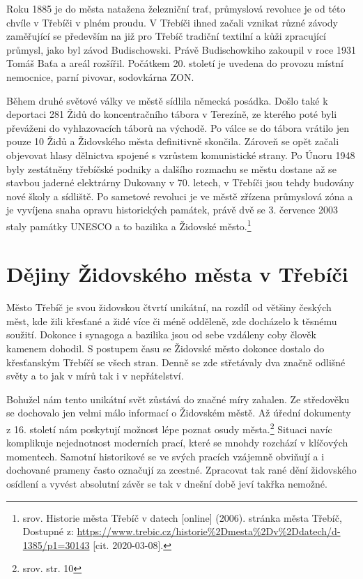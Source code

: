 \documentclass[a4paper,oneside,12pt]{report}
\begin{document}
Roku 1885 je do města natažena železniční trať, průmyslová revoluce je od této chvíle v Třebíči v plném proudu.
V Třebíči ihned začali vznikat různé závody zaměřující se především na již pro Třebíč tradiční textilní a kůži zpracující průmysl, jako byl závod Budischowski.
Právě Budischowkiho zakoupil v roce 1931 Tomáš Baťa a areál rozšířil.
Počátkem 20. století je uvedena do provozu místní nemocnice, parní pivovar, sodovkárna ZON.

Během druhé světové války ve městě sídlila německá posádka.
Došlo také k deportaci 281 Židů do koncentračního tábora v Terezíně, ze kterého poté byli převáženi do vyhlazovacích táborů na východě.
Po válce se do tábora vrátilo jen pouze 10 Židů a  Židovského města definitivně skončila.
Zároveň se opět začali objevovat hlasy dělnictva spojené s vzrůstem komunistické strany.
Po Únoru 1948 byly zestátněny třebíčské podniky a dalšího rozmachu se městu dostane až se stavbou jaderné elektrárny Dukovany v 70. letech, v Třebíči jsou tehdy budovány nové školy a sídliště.
Po sametové revoluci je ve městě zřízena průmyslová zóna a je vyvíjena snaha opravu historických památek, právě dvě se 3. července 2003 staly památky UNESCO a to bazilika a Židovské město.\footnote{srov. Historie města Třebíč v datech [online] (2006). stránka města Třebíč, Dostupné z: \url{https://www.trebic.cz/historie\%2Dmesta\%2Dv\%2Ddatech/d-1385/p1=30143} [cit. 2020-03-08]. }


\chapter{Dějiny Židovského města v Třebíči}

Město Třebíč je svou židovskou čtvrtí unikátní, na rozdíl od většiny českých měst, kde žili křesťané a židé více či méně odděleně, zde docházelo k těsnému soužití.
Dokonce i synagoga a bazilika jsou od sebe vzdáleny coby člověk kamenem dohodil.
S postupem času se Židovské město dokonce dostalo do  křesťanským Třebíčí se všech stran.
Denně se zde střetávaly dva značně odlišné světy a to jak v mírů tak i v nepřátelství.

Bohužel nám tento unikátní svět zůstává do značné míry zahalen.
Ze středověku se dochovalo jen velmi málo informací o Židovském městě.
Až úřední dokumenty z 16. století nám poskytují možnost lépe poznat osudy města.\footnote{srov.  str. 10}
Situaci navíc komplikuje nejednotnost moderních prací, které se mnohdy rozchází v klíčových momentech.
Samotní historikové se ve svých pracích vzájemně obviňují a i dochované prameny často označují za zcestné.
Zpracovat tak rané dění židovského osídlení a vyvést absolutní závěr se tak v dnešní době jeví takřka nemožné.
\end{document}
